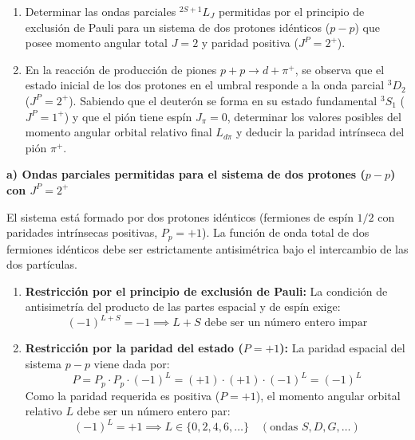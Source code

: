 \begin{problema}
\begin{enumerate}[label=\alph*)]
    \item Determinar las ondas parciales $^{2S+1}L_J$ permitidas por el principio de exclusión de Pauli para un sistema de dos protones idénticos ($p-p$) que posee momento angular total $J = 2$ y paridad positiva ($J^P = 2^+$).
    \item En la reacción de producción de piones $p + p \to d + \pi^+$, se observa que el estado inicial de los dos protones en el umbral responde a la onda parcial $^3D_2$ ($J^P = 2^+$). Sabiendo que el deuterón se forma en su estado fundamental $^3S_1$ ($J^P = 1^+$) y que el pión tiene espín $J_\pi = 0$, determinar los valores posibles del momento angular orbital relativo final $L_{d\pi}$ y deducir la paridad intrínseca del pión $\pi^+$.
\end{enumerate}

\tcblower

\textbf{a) Ondas parciales permitidas para el sistema de dos protones ($p-p$) con $J^P = 2^+$}

El sistema está formado por dos protones idénticos (fermiones de espín $1/2$ con paridades intrínsecas positivas, $P_p = +1$). La función de onda total de dos fermiones idénticos debe ser estrictamente antisimétrica bajo el intercambio de las dos partículas.

\begin{enumerate}[label=\arabic*.]
    \item \textbf{Restricción por el principio de exclusión de Pauli:}
    La condición de antisimetría del producto de las partes espacial y de espín exige:
    \begin{equation*}
        (-1)^{L + S} = -1 \implies L + S \text{ debe ser un número entero impar}
    \end{equation*}

    \item \textbf{Restricción por la paridad del estado ($P = +1$):}
    La paridad espacial del sistema $p-p$ viene dada por:
    \begin{equation*}
        P = P_p \cdot P_p \cdot (-1)^L = (+1) \cdot (+1) \cdot (-1)^L = (-1)^L
    \end{equation*}
    Como la paridad requerida es positiva ($P = +1$), el momento angular orbital relativo $L$ debe ser un número entero par:
    \begin{equation*}
        (-1)^L = +1 \implies L \in \{0, 2, 4, 6, \dots\} \quad (\text{ondas } S, D, G, \dots)
    \end{equation*}


\end{enumerate}
\end{problema}
